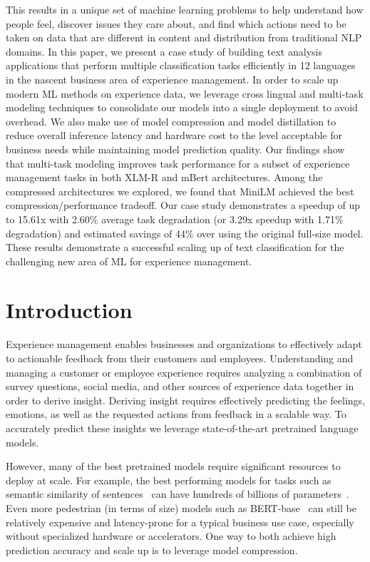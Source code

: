 This results in a unique set of machine learning problems to help understand how people feel, discover issues they care about, and find which actions need to be taken on data that are different in content and distribution from traditional NLP domains.
In this paper, we present a case study of building text analysis applications that perform multiple classification tasks efficiently in 12 languages in the nascent business area of experience management.
In order to scale up modern ML methods on experience data, we leverage cross lingual and multi-task modeling techniques to consolidate our models into a single deployment to avoid overhead.
We also make use of model compression and model distillation to reduce overall inference latency and hardware cost to the level acceptable for business needs while maintaining model prediction quality.
Our findings show that multi-task modeling improves task performance for a subset of experience management tasks in both XLM-R and mBert architectures.
Among the compressed architectures we explored, we found that MiniLM achieved the best compression/performance tradeoff.
Our case study demonstrates a speedup of up to 15.61x with 2.60\% average task degradation (or 3.29x speedup with 1.71\% degradation) and estimated savings of 44\% over using the original full-size model.
These results demonstrate a successful scaling up of text classification for the challenging new area of ML for experience management.
\section{Introduction}
Experience management enables businesses and organizations to effectively adapt to actionable feedback from their customers and employees.
Understanding and managing a customer or employee experience requires analyzing a combination of survey questions, social media, and other sources of experience data together in order to derive insight.
Deriving insight requires effectively predicting the feelings, emotions, as well as the requested actions from feedback in a scalable way.
To accurately predict these insights we leverage state-of-the-art pretrained language models.

However, many of the best pretrained models require significant resources to deploy at scale. 
For example, the best performing models for tasks such as semantic similarity of sentences~\cite{wang2018glue} can have hundreds of billions of parameters~\cite{smith2022using}.
Even more pedestrian (in terms of size) models such as BERT-base~\cite{devlin-etal-2019-bert} can still be relatively expensive and latency-prone for a typical business use case, especially without specialized hardware or accelerators.
One way to both achieve high prediction accuracy and scale up is to leverage model compression.


